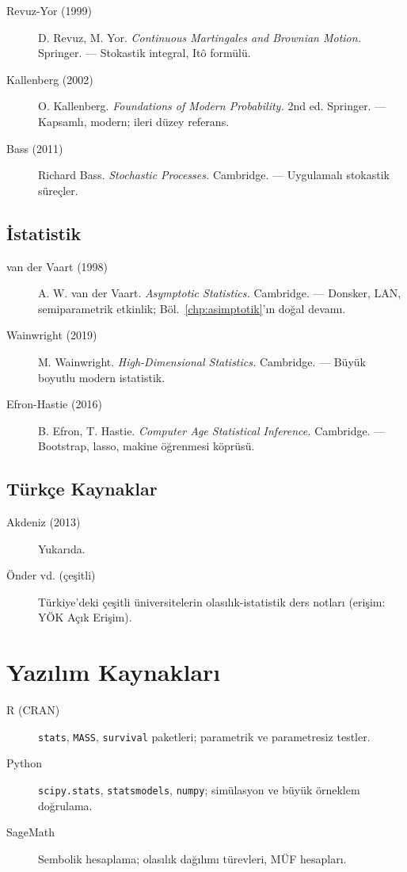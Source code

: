 \begin{description}
  \item[Revuz-Yor (1999)] D. Revuz, M. Yor. \textit{Continuous Martingales and Brownian Motion.} Springer. --- Stokastik integral, Itô formülü.
  \item[Kallenberg (2002)] O. Kallenberg. \textit{Foundations of Modern Probability.} 2nd ed. Springer. --- Kapsamlı, modern; ileri düzey referans.
  \item[Bass (2011)] Richard Bass. \textit{Stochastic Processes.} Cambridge. --- Uygulamalı stokastik süreçler.
\end{description}

\subsection{İstatistik}

\begin{description}
  \item[van der Vaart (1998)] A. W. van der Vaart. \textit{Asymptotic Statistics.} Cambridge. --- Donsker, LAN, semiparametrik etkinlik; Böl.~\ref{chp:asimptotik}'ın doğal devamı.
  \item[Wainwright (2019)] M. Wainwright. \textit{High-Dimensional Statistics.} Cambridge. --- Büyük boyutlu modern istatistik.
  \item[Efron-Hastie (2016)] B. Efron, T. Hastie. \textit{Computer Age Statistical Inference.} Cambridge. --- Bootstrap, lasso, makine öğrenmesi köprüsü.
\end{description}

\subsection{Türkçe Kaynaklar}

\begin{description}
  \item[Akdeniz (2013)] Yukarıda.
  \item[Önder vd. (çeşitli)] Türkiye'deki çeşitli üniversitelerin olasılık-istatistik ders notları (erişim: YÖK Açık Erişim).
\end{description}

\section{Yazılım Kaynakları}

\begin{description}
  \item[R (CRAN)] \texttt{stats}, \texttt{MASS}, \texttt{survival} paketleri; parametrik ve parametresiz testler.
  \item[Python] \texttt{scipy.stats}, \texttt{statsmodels}, \texttt{numpy}; simülasyon ve büyük örneklem doğrulama.
  \item[SageMath] Sembolik hesaplama; olasılık dağılımı türevleri, MÜF hesapları.
\end{description}

